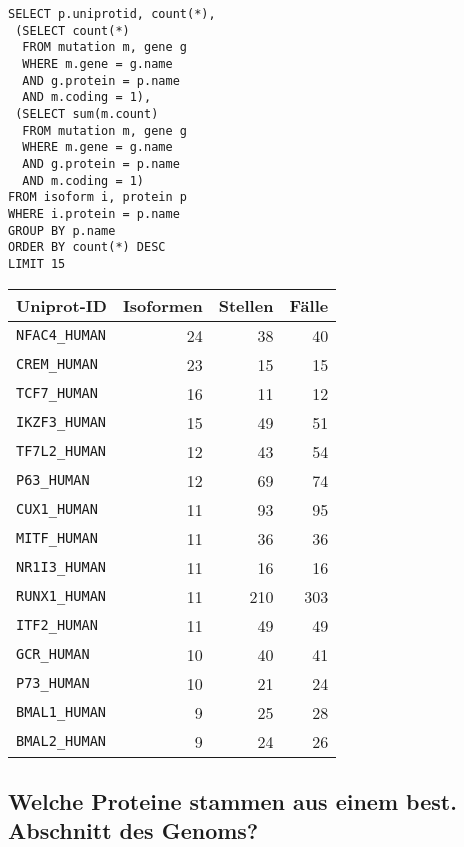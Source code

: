 \documentclass{scrartcl}
\begin{document}
\noindent\begin{minipage}{.4\hsize}
\begin{verbatim}
SELECT p.uniprotid, count(*),
 (SELECT count(*)
  FROM mutation m, gene g
  WHERE m.gene = g.name
  AND g.protein = p.name
  AND m.coding = 1),
 (SELECT sum(m.count)
  FROM mutation m, gene g
  WHERE m.gene = g.name
  AND g.protein = p.name
  AND m.coding = 1)
FROM isoform i, protein p
WHERE i.protein = p.name
GROUP BY p.name
ORDER BY count(*) DESC
LIMIT 15
\end{verbatim}
\end{minipage}
\begin{minipage}{.6\hsize}
\hfill\begin{tabular}{lrrr}
\toprule
Uniprot-ID & Isoformen & Stellen & Fälle \\
\midrule
\verb|NFAC4_HUMAN|&24&38&40\\
\verb|CREM_HUMAN|&23&15&15\\
\verb|TCF7_HUMAN|&16&11&12\\
\verb|IKZF3_HUMAN|&15&49&51\\
\verb|TF7L2_HUMAN|&12&43&54\\
\verb|P63_HUMAN|&12&69&74\\
\verb|CUX1_HUMAN|&11&93&95\\
\verb|MITF_HUMAN|&11&36&36\\
\verb|NR1I3_HUMAN|&11&16&16\\
\verb|RUNX1_HUMAN|&11&210&303\\
\verb|ITF2_HUMAN|&11&49&49\\
\verb|GCR_HUMAN|&10&40&41\\
\verb|P73_HUMAN|&10&21&24\\
\verb|BMAL1_HUMAN|&9&25&28\\
\verb|BMAL2_HUMAN|&9&24&26\\
\bottomrule
\end{tabular}
\end{minipage}

\subsection{Welche Proteine stammen aus einem best. Abschnitt des Genoms?}
\end{document}
